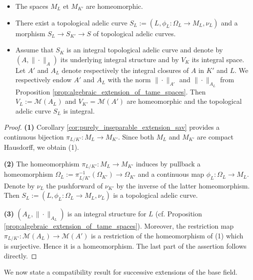 \documentclass [11pt,reqno]{amsart}
\newcommand{\1}{\mathmybb{1}}
\def\cM{{\mathcal{M}}}
\begin{document}
\begin{proposition}
\label{prop:purely_inseparable_extension_tac}
\begin{itemize}
	\item[(1)] The spaces $M_L$ et $M_{K'}$ are homeomorphic.

	\item[(2)] There exist a topological adelic curve $S_L := (L,\phi_L:\Omega_{L}\to M_{L},\nu_{L})$ and a morphism $S_L \to S_{K'} \to S$ of topological adelic curves. 
	\item[(3)] Assume that $S_K$ is an integral topological adelic curve and denote by $(A,\|\cdot\|_A)$ its underlying integral structure and by $V_K$ its integral space. Let $A'$ and $A_L$ denote respectively the integral closures of $A$ in $K'$ and $L$. We respectively endow $A'$ and $A_L$ with the norm $\|\cdot\|_{A'}$ and $\|\cdot\|_{A_L}$ from Proposition \ref{prop:algebraic_extension_of_tame_spaces}. Then $V_L := \cM(A_L)$ and $V_{K'} = \cM(A')$ are homeomorphic and the topological adelic curve $S_L$ is integral.
\end{itemize}
\end{proposition}

\begin{proof}
\textbf{(1)} Corollary \ref{cor:purely_inseparable_extension_sav} provides a continuous bijection $\pi_{L/K'} : M_L \to M_{K'}$. Since both $M_L$ and $M_{K'}$ are compact Hausdorff, we obtain (1).

\textbf{(2)} The homeomorphism $\pi_{L/K'} : M_L \to M_{K'}$ induces by pullback a homeomorphism $\Omega_L:= \pi_{L/K'}^{-1}(\Omega_{K'})\to \Omega_{K'}$ and a continuous map $\phi_L :\Omega_{L} \to M_{L}$. Denote by $\nu_{L}$ the pushforward of $\nu_{K'}$ by the inverse of the latter homeomorphism. Then $S_L := (L,\phi_L : \Omega_L \to M_L,\nu_{L})$ is a topological adelic curve.

\textbf{(3)} $(A_L,\|\cdot\|_{A_L})$ is an integral structure for $L$ (cf. Proposition \ref{prop:algebraic_extension_of_tame_spaces}). Moreover, the restriction map $\pi_{L/K'}: \cM(A_L) \to \cM(A')$ is a restriction of the homeomorphism of (1) which is surjective. Hence it is a homeomorphism. The last part of the assertion follows directly.
\end{proof}

We now state a compatibility result for successive extensions of the base field.
\end{document}
